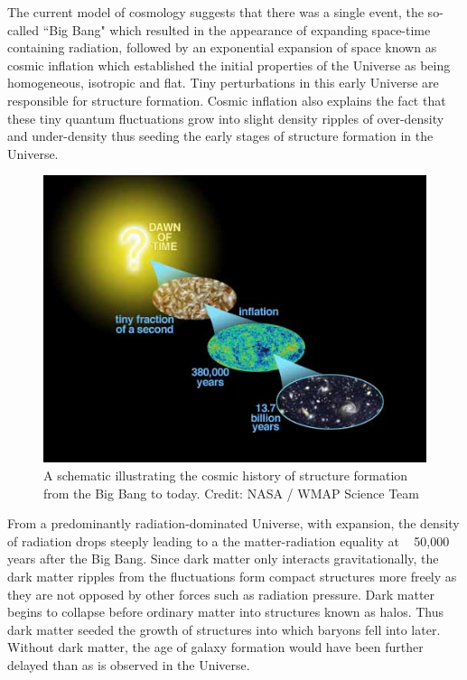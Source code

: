 The current model of cosmology suggests that there was a single event, the so-called ``Big Bang" which resulted in the appearance of expanding space-time containing radiation, followed by an exponential expansion of space known as cosmic inflation \citep{PhysRevD.23.347} which established the initial properties of the Universe as being homogeneous, isotropic and flat. Tiny perturbations in this early Universe are responsible for structure formation. Cosmic inflation also explains the fact that these tiny quantum fluctuations grow into slight density ripples of over-density and under-density thus seeding the early stages of structure formation in the Universe.\\

\begin{figure}
\includegraphics[width=\textwidth]{figures/wmap_cosmic_history}
\caption[A schematic illustrating the cosmic history of structure formation from the Big Bang to today]
{ A schematic illustrating the cosmic history of structure formation from the Big Bang to today. Credit: NASA / WMAP Science Team
\label{fig:cosmic_history}}
\end{figure}

From a predominantly radiation-dominated Universe, with expansion, the density of radiation drops steeply leading to a the matter-radiation equality at ~ 50,000 years after the Big Bang. Since dark matter only interacts gravitationally, the dark matter ripples from the fluctuations form compact structures more freely as they are not opposed by other forces such as radiation pressure. Dark matter begins to collapse before ordinary matter into structures known as halos. Thus dark matter seeded the growth of structures into which baryons fell into later. Without dark matter, the age of galaxy formation would have been further delayed than as is observed in the Universe.\\

